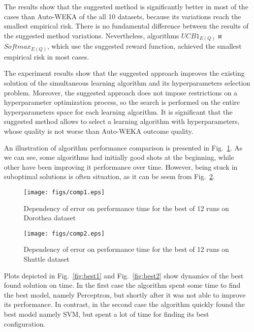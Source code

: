 \documentclass{svproc}
\begin{document}
The results show that the suggested method is significantly better in most of the cases than Auto-WEKA of the all 10 datasets, because its variations reach the smallest empirical risk. There is no fundamental difference between the results of the suggested method variations. Nevertheless, algorithms $UCB1_{E(Q)}$ и $Softmax_{E(Q)}$, which use the suggested reward function, achieved the smallest empirical risk in most cases. 

The experiment results show that the suggested approach improves the existing solution of the simultaneous learning algorithm and its hyperparameters selection problem. Moreover, the suggested approach does not impose restrictions on a hyperparameter optimization process, so the search is performed on the entire hyperparameters space for each learning algorithm. It is significant that the suggested method allows to select a learning algorithm with hyperparameters, whose quality is not worse than Auto-WEKA outcome quality. 

An illustration of algorithm performance comparison is presented in Fig.~\ref{fig:comp1}. As we can see, some algorithms had initially good shots at the beginning, while other have been improving it performance over time. However, being stuck in suboptimal solutions is often situation, as it can be seem from Fig.~\ref{fig:comp2}. 

\begin{figure}
\vspace{2.5cm}
\texttt{[image: figs/comp1.eps]}
\caption{Dependency of error on performance time for the best of 12 runs on Dorothea dataset}\label{fig:comp1}
\end{figure}

\begin{figure}
\vspace{2.5cm}
\texttt{[image: figs/comp2.eps]}
\caption{Dependency of error on performance time for the best of 12 runs on Shuttle dataset}\label{fig:comp2}
\end{figure}

Plots depicted in Fig.~\ref{fig:best1} and Fig.~\ref{fig:best2} show dynamics of the best found solution on time. In the first case the algorithm spent some time to find the best model, namely Perceptron, but shortly after it was not able to improve its performance. In contrast, in the second case the algorithm quickly found the best model namely SVM, but spent a lot of time for finding its best configuration.
\end{document}
